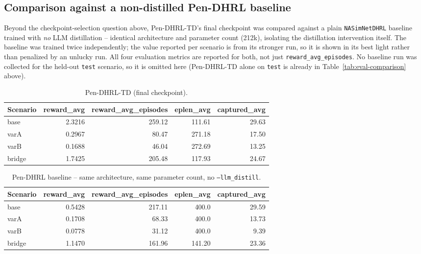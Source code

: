 \documentclass[11pt]{article}
\newcommand{\pendhrl}{Pen-DHRL-TD}
\newcommand{\code}[1]{\texttt{#1}}
\begin{document}
\subsection{Comparison against a non-distilled Pen-DHRL baseline}
\label{sec:baseline-comparison}
Beyond the checkpoint-selection question above, \pendhrl{}'s final checkpoint was
compared against a plain \code{NASimNetDHRL} baseline trained with \emph{no} LLM
distillation -- identical architecture and parameter count (212k), isolating the
distillation intervention itself. The baseline was trained twice independently; the
value reported per scenario is from its stronger run, so it is shown in its best
light rather than penalized by an unlucky run. All four evaluation metrics are
reported for both, not just \code{reward\_avg\_episodes}. No baseline run was
collected for the held-out \code{test} scenario, so it is omitted here (Pen-DHRL-TD
alone on \code{test} is already in Table~\ref{tab:eval-comparison} above).

\begin{table}[H]
\centering
\caption{\pendhrl{} (final checkpoint).}
\label{tab:baseline-comparison-td}
\small
\begin{tabular}{lrrrr}
\toprule
Scenario & reward\_avg & reward\_avg\_episodes & eplen\_avg & captured\_avg \\
\midrule
base   & 2.3216 & 259.12 & 111.61 & 29.63 \\
varA   & 0.2967 & 80.47  & 271.18 & 17.50 \\
varB   & 0.1688 & 46.04  & 272.69 & 13.25 \\
bridge & 1.7425 & 205.48 & 117.93 & 24.67 \\
\bottomrule
\end{tabular}
\end{table}

\begin{table}[H]
\centering
\caption{Pen-DHRL baseline -- same architecture, same parameter count, no
\code{--llm\_distill}.}
\label{tab:baseline-comparison-base}
\small
\begin{tabular}{lrrrr}
\toprule
Scenario & reward\_avg & reward\_avg\_episodes & eplen\_avg & captured\_avg \\
\midrule
base   & 0.5428 & 217.11 & 400.0 & 29.59 \\
varA   & 0.1708 & 68.33  & 400.0 & 13.73 \\
varB   & 0.0778 & 31.12  & 400.0 & 9.39 \\
bridge & 1.1470 & 161.96 & 141.20 & 23.36 \\
\bottomrule
\end{tabular}
\end{table}
\end{document}
